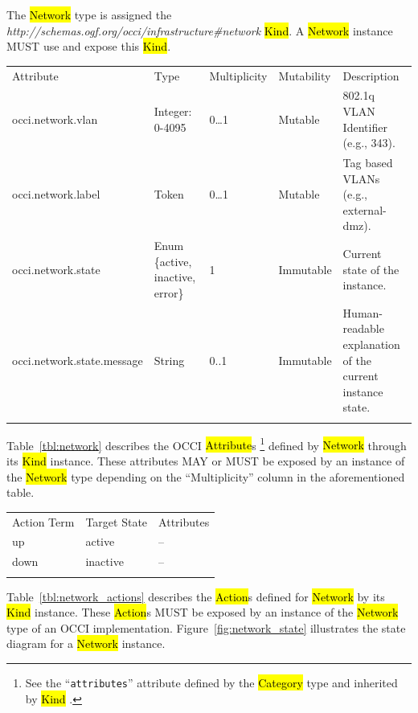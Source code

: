 \documentclass[10pt,a4paper]{article}
\begin{document}
The \hl{Network} type is assigned the
\textit{http://schemas.ogf.org/occi/infrastructure\#network}
\hl{Kind}. A \hl{Network} instance MUST use and expose this \hl{Kind}.

{
	\begin{tabular}{lp{2.5cm}p{1cm}lp{5cm}}
	\toprule
	Attribute&Type&Multi\-plicity&Mutability&Description\\
	\colrule
	occi.network.vlan & Integer: 0-4095 & 0\ldots1 & Mutable
	& 802.1q VLAN Identifier (e.g., 343).\\
	occi.network.label & Token & 0\ldots1 & Mutable
	& Tag based VLANs (e.g., external-dmz).\\
	occi.network.state & Enum \{active, inactive, error\} & 1 & Immutable
	& Current state of the instance.\\
	occi.network.state.message & String & 0..1 & Immutable
	& Human-readable explanation of the current instance state.\\
	\botrule
	\end{tabular}
}

Table~\ref{tbl:network} describes the OCCI \hl{Attribute}s%
\footnote{See the ``{\tt attributes}'' attribute defined by the
  \hl{Category} type and inherited by \hl{Kind} \cite{occi:core}.}
defined by \hl{Network} through its \hl{Kind} instance. These attributes
MAY or MUST be exposed by an instance of the \hl{Network} type
depending on the ``Multiplicity'' column in the aforementioned table.

{
	\begin{tabular}{lll}
	\toprule
	Action Term&Target State&Attributes\\
	\colrule
	up & active & --\\
	down & inactive & --\\
	\botrule
	\end{tabular}
}

Table~\ref{tbl:network_actions} describes the \hl{Action}s defined for
\hl{Network} by its \hl{Kind} instance. These \hl{Action}s MUST be
exposed by an instance of the \hl{Network} type of an OCCI
implementation.  Figure~\ref{fig:network_state} illustrates the state
diagram for a \hl{Network} instance.
\end{document}
